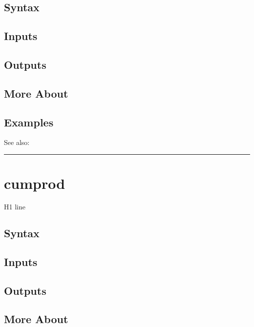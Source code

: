 \documentclass[letterpaper,10pt,english]{sphinxmanual}
\begin{document}
\subsection{Syntax}
\label{classes/time_series/@ts/ts:id156}

\subsection{Inputs}
\label{classes/time_series/@ts/ts:id157}

\subsection{Outputs}
\label{classes/time_series/@ts/ts:id158}

\subsection{More About}
\label{classes/time_series/@ts/ts:id159}

\subsection{Examples}
\label{classes/time_series/@ts/ts:id160}
See also:


\bigskip\hrule{}\bigskip



\section{cumprod}
\label{classes/time_series/@ts/ts:cumprod}\label{classes/time_series/@ts/ts:id161}
H1 line


\subsection{Syntax}
\label{classes/time_series/@ts/ts:id162}

\subsection{Inputs}
\label{classes/time_series/@ts/ts:id163}

\subsection{Outputs}
\label{classes/time_series/@ts/ts:id164}

\subsection{More About}
\label{classes/time_series/@ts/ts:id165}
\end{document}
